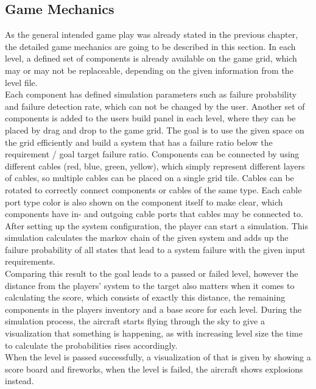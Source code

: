 \subsection{Game Mechanics}\label{subsec:game-mechanics}
As the general intended game play was already stated in the previous chapter, the detailed game mechanics are going to be described in this section.
In each level, a defined set of components is already available on the game grid, which may or may not be replaceable, depending on the given
information from the level file.
\\
Each component has defined simulation parameters such as failure probability and failure detection rate, which can not be changed by the user.
Another set of components is added to the users build panel in each level, where they can be placed by drag and drop to the game grid.
The goal is to use the given space on the grid efficiently and build a system that has a failure ratio below the requirement / goal target failure ratio.
Components can be connected by using different cables (red, blue, green, yellow), which simply represent different layers of cables, so multiple
cables can be placed on a single grid tile.
Cables can be rotated to correctly connect components or cables of the same type.
Each cable port type color is also shown on the component itself to make clear, which components have in- and outgoing cable ports
that cables may be connected to.
\\
After setting up the system configuration, the player can start a simulation.
This simulation calculates the markov chain of the given system and adds up the failure probability of all states that lead to a system failure with the given
input requirements.
\\
Comparing this result to the goal leads to a passed or failed level, however the distance from the players' system to the target also matters when it comes to calculating
the score, which consists of exactly this distance, the remaining components in the players inventory and a base score for each level.
During the simulation process, the aircraft starts flying through the sky to give a visualization that something is happening, as with increasing
level size the time to calculate the probabilities rises accordingly.
\\
When the level is passed successfully, a visualization of that is given by showing a score board and fireworks, when the level is failed, the aircraft
shows explosions instead.

